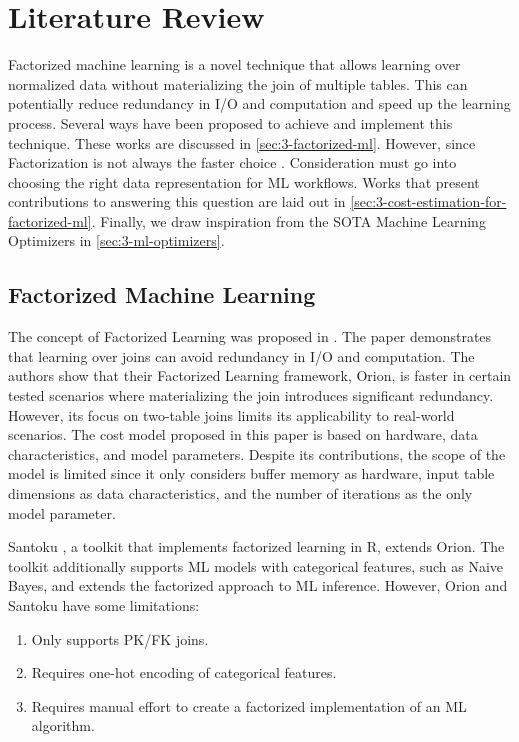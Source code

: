 
\chapter{Literature Review}
\label{chapter:literature}

Factorized machine learning is a novel technique that allows learning over normalized data without materializing the join of multiple tables. This can potentially reduce redundancy in I/O and computation and speed up the learning process. Several ways have been proposed to achieve and implement this technique. These works are discussed in \autoref{sec:3-factorized-ml}. However, since Factorization is not always the faster choice \cite{orion_learning_gen_lin_models, morpheus, amalur,schijndel_cost_estimation}. Consideration must go into choosing the right data representation for ML workflows. Works that present contributions to answering this question are laid out in \autoref{sec:3-cost-estimation-for-factorized-ml}. Finally, we draw inspiration from the SOTA Machine Learning Optimizers in \autoref{sec:3-ml-optimizers}.

\section{Factorized Machine Learning}
\label{sec:3-factorized-ml}
The concept of Factorized Learning was proposed in \cite{orion_learning_gen_lin_models}. The paper demonstrates that learning over joins can avoid redundancy in I/O and computation. The authors show that their Factorized Learning framework, Orion, is faster in certain tested scenarios where materializing the join introduces significant redundancy. However, its focus on two-table joins limits its applicability to real-world scenarios. The cost model proposed in this paper is based on hardware, data characteristics, and model parameters. Despite its contributions, the scope of the model is limited since it only considers buffer memory as hardware, input table dimensions as data characteristics, and the number of iterations as the only model parameter.

Santoku \cite{santoku_kumar_demonstration_2015}, a toolkit that implements factorized learning in R, extends Orion. The toolkit additionally supports ML models with categorical features, such as Naive Bayes, and extends the factorized approach to ML inference. However, Orion and Santoku have some limitations:

\begin{enumerate}
    \item Only supports PK/FK joins.
    \item Requires one-hot encoding of categorical features.
    \item Requires manual effort to create a factorized implementation of an ML algorithm.
\end{enumerate}

